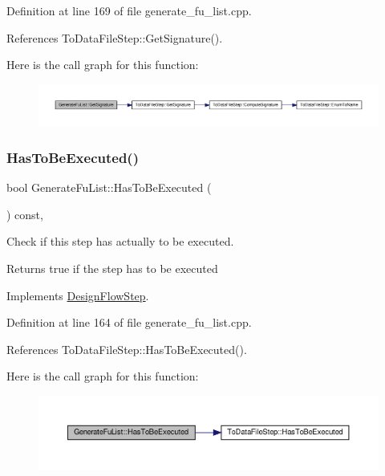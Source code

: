 Definition at line 169 of file generate\+\_\+fu\+\_\+list.\+cpp.



References To\+Data\+File\+Step\+::\+Get\+Signature().

Here is the call graph for this function\+:
\nopagebreak
\begin{figure}[H]
\begin{center}
\leavevmode
\includegraphics[width=350pt]{db/dea/classGenerateFuList_a7bd13ddbc7a4b82d834a9cd0812d4b90_cgraph}
\end{center}
\end{figure}
\mbox{\label{classGenerateFuList_ae5f29f70bd0b315ffa9369fc93fa5096}} 
\subsubsection{\texorpdfstring{Has\+To\+Be\+Executed()}{HasToBeExecuted()}}
{\footnotesize\ttfamily bool Generate\+Fu\+List\+::\+Has\+To\+Be\+Executed (\begin{DoxyParamCaption}{ }\end{DoxyParamCaption}) const\hspace{0.3cm}{\ttfamily [override]}, {\ttfamily [virtual]}}



Check if this step has actually to be executed. 

\begin{DoxyReturn}{Returns}
true if the step has to be executed 
\end{DoxyReturn}


Implements \hyperlink{classDesignFlowStep_a1783abe0c1d162a52da1e413d5d1ef05}{Design\+Flow\+Step}.



Definition at line 164 of file generate\+\_\+fu\+\_\+list.\+cpp.



References To\+Data\+File\+Step\+::\+Has\+To\+Be\+Executed().

Here is the call graph for this function\+:
\nopagebreak
\begin{figure}[H]
\begin{center}
\leavevmode
\includegraphics[width=350pt]{db/dea/classGenerateFuList_ae5f29f70bd0b315ffa9369fc93fa5096_cgraph}
\end{center}
\end{figure}


